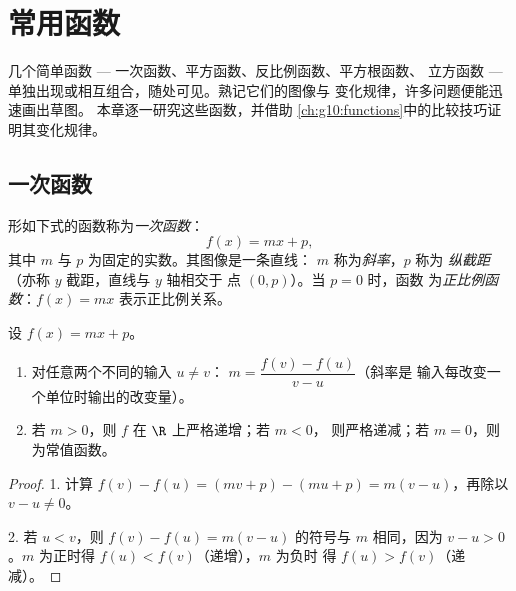 \chapter{常用函数}\label{ch:g10:reffunc}

几个简单函数 --- 一次函数、平方函数、反比例函数、平方根函数、
立方函数 --- 单独出现或相互组合，随处可见。熟记它们的图像与
变化规律，许多问题便能迅速画出草图。
本章逐一研究这些函数，并借助
\cref{ch:g10:functions}中的比较技巧证明其变化规律。

\section{一次函数}

\begin{definition}[一次函数]\label{def:g10:reffunc:affine}
形如下式的函数称为\emph{一次函数}：
\[
f(x) = mx + p,
\]
其中 $m$ 与 $p$ 为固定的实数。其图像是一条直线：
$m$ 称为\emph{斜率}，$p$ 称为
\emph{纵截距}（亦称 $y$ 截距，直线与 $y$ 轴相交于
点 $(0, p)$）。当 $p = 0$ 时，函数
为\emph{正比例函数}：$f(x) = mx$ 表示正比例关系。
\end{definition}

\begin{proposition}[斜率与单调性]\label{prop:g10:reffunc:affine}
设 $f(x) = mx + p$。
\begin{enumerate}
  \item 对任意两个不同的输入 $u \neq v$：
        $m = \dfrac{f(v) - f(u)}{v - u}$（斜率是
        输入每改变一个单位时输出的改变量）。
  \item 若 $m > 0$，则 $f$ 在 $\R$ 上严格递增；若 $m < 0$，
        则严格递减；若 $m = 0$，则为常值函数。
\end{enumerate}
\end{proposition}

\begin{proof}
1. 计算 $f(v) - f(u) = (mv + p) - (mu + p) = m(v - u)$，再除以
$v - u \neq 0$。

2. 若 $u < v$，则 $f(v) - f(u) = m(v-u)$ 的符号与 $m$ 相同，因为
$v - u > 0$。$m$ 为正时得 $f(u) < f(v)$（递增），$m$ 为负时
得 $f(u) > f(v)$（递减）。
\end{proof}

